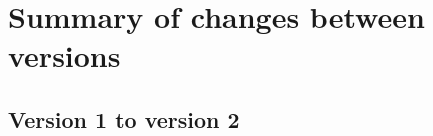 \section{Summary of changes between versions} 
\label{apdx-new}

\subsection{Version 1 to version 2} 
\label{apdx-new-one-to-two}


